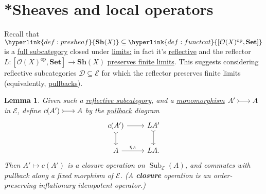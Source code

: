 \documentclass{article}
\makeatletter
\DeclareMathOperator{\Sub}{Sub}
\newcommand{\bonusnamed}[1]{\textbf{#1}\index{#1@*#1}}
\newenvironment{tikzcdi}{\begin{tikzcd}[cramped, sep=scriptsize]}{\end{tikzcd}}
\newtheorem{nlemma}[nthm]{Lemma}
\makeatother
\begin{document}
\section*{*Sheaves and local operators}
Recall that $\hyperlink{def:presheaf}{\mathbf{Sh}(X)} \subseteq \hyperlink{def:functcat}{[\mathcal{O}(X)^{\text{op}}, \mathbf{Set}]}$ is a \hyperlink{def:fulls}{full subcategory} closed under \hyperlink{def:limit}{limits:} in fact it's \hyperlink{def:refl}{reflective} and the reflector $L: [\mathcal{O}(X)^{\text{op}}, \mathbf{Set}] \to \mathbf{Sh}(X)$ \hyperlink{def:plim}{preserves finite limits}.
This suggests considering reflective subcategories $\mathscr{D} \subseteq \mathscr{E}$ for which the reflector preserves finite limits (equivalently, \hyperlink{def:pullback}{pullbacks}).
\begin{nlemma}\label{lem:7.15}
  Given such a \hyperlink{def:refl}{reflective subcategory}, and a \hyperlink{def:monic}{monomorphism} $\begin{tikzcdi} A' \rar[tail] & A \end{tikzcdi}$ in $\mathscr{E}$, define $\begin{tikzcdi} c(A') \rar[tail] & A \end{tikzcdi}$ by the \hyperlink{def:pullback}{pullback} diagram
  \begin{equation*}
  \begin{tikzcd}
    c(A') \rar \dar[tail] & LA' \dar[tail] \\
    A \rar{\eta_A} & LA.
  \end{tikzcd}
  \end{equation*}
  Then $A' \mapsto c(A')$ is a closure operation on $\Sub_\mathscr{E}(A)$, and commutes with pullback along a fixed morphism of $\mathscr{E}$.
  (A \hypertarget{def:closure}{\bonusnamed{closure}} operation is an order-preserving inflationary idempotent operator.)
\end{nlemma}
\end{document}
